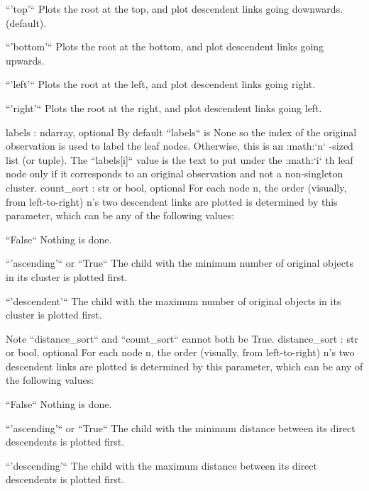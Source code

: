 \begin{DoxyVerb}
    ``'top'``
      Plots the root at the top, and plot descendent links going downwards.
      (default).

    ``'bottom'``
      Plots the root at the bottom, and plot descendent links going
      upwards.

    ``'left'``
      Plots the root at the left, and plot descendent links going right.

    ``'right'``
      Plots the root at the right, and plot descendent links going left.

labels : ndarray, optional
    By default ``labels`` is None so the index of the original observation
    is used to label the leaf nodes.  Otherwise, this is an :math:`n`
    -sized list (or tuple). The ``labels[i]`` value is the text to put
    under the :math:`i` th leaf node only if it corresponds to an original
    observation and not a non-singleton cluster.
count_sort : str or bool, optional
    For each node n, the order (visually, from left-to-right) n's
    two descendent links are plotted is determined by this
    parameter, which can be any of the following values:

    ``False``
      Nothing is done.

    ``'ascending'`` or ``True``
      The child with the minimum number of original objects in its cluster
      is plotted first.

    ``'descendent'``
      The child with the maximum number of original objects in its cluster
      is plotted first.

    Note ``distance_sort`` and ``count_sort`` cannot both be True.
distance_sort : str or bool, optional
    For each node n, the order (visually, from left-to-right) n's
    two descendent links are plotted is determined by this
    parameter, which can be any of the following values:

    ``False``
      Nothing is done.

    ``'ascending'`` or ``True``
      The child with the minimum distance between its direct descendents is
      plotted first.

    ``'descending'``
      The child with the maximum distance between its direct descendents is
      plotted first.


\end{DoxyVerb}
